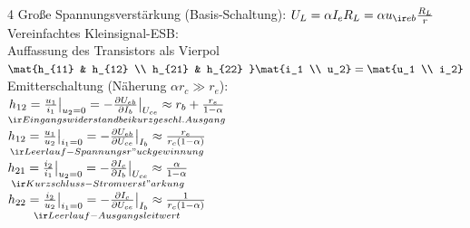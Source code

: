 \documentclass[fs, footer]{latex4ei_custom}
\begin{document}
\begin{multicols*}{4}
	Große Spannungsverstärkung (Basis-Schaltung): $U_L = \alpha I_eR_L = \alpha u_{\ir eb} \frac{R_L}{r}$\\
	Vereinfachtes Kleinsignal-ESB:\\
	Auffassung des Transistors als Vierpol\\
	$\mat{h_{11} & h_{12} \\ h_{21} & h_{22} } \mat{i_1 \\ u_2} = \mat{u_1 \\ i_2}$\\
	Emitterschaltung (Näherung $\alpha r_c \gg r_e$):\\
	$\underset{\ir Eingangswiderstand bei kurzgeschl. Ausgang}{h_{12} = \frac{u_1}{i_1}\big|_{u_2=0} = -\frac{\partial U_{eb}}{\partial I_b}\big|_{U_{ce}} \approx r_b+\frac{r_e}{1-\alpha}}$ \ \\
	$\underset{\ir Leerlauf-Spannungsr"uckgewinnung}{h_{12} = \frac{u_1}{u_2}\big|_{i_1=0} = -\frac{\partial U_{eb}}{\partial U_{ce}}\big|_{I_b} \approx \frac{r_e}{r_c(1-\alpha)}}$ \\
	$\underset{\ir Kurzschluss-Stromverst"arkung}{h_{21} = \frac{i_2}{i_1}\big|_{u_2=0} = -\frac{\partial I_c}{\partial I_b}\big|_{U_{ce}} \approx \frac{\alpha}{1-\alpha}}$\\
	$\underset{\ir Leerlauf-Ausgangsleitwert}{h_{22} = \frac{i_2}{u_2}\big|_{i_1=0} = -\frac{\partial I_c}{\partial U_{ce}}\big|_{I_b} \approx \frac{1}{r_c(1-\alpha)}}$\\
\end{multicols*}

\end{document}
